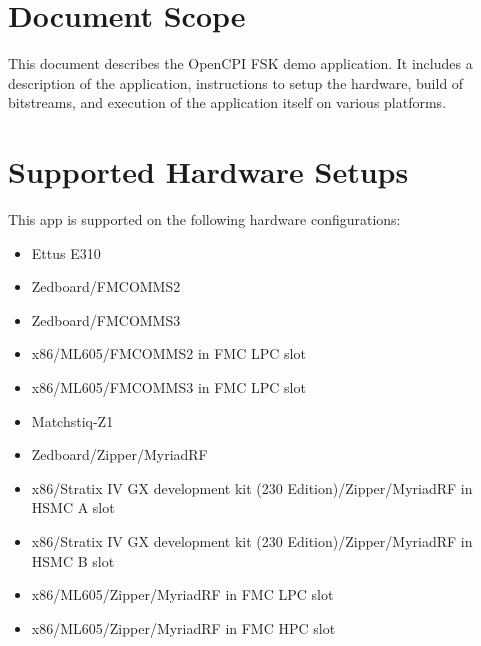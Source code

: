 \newpage
\tableofcontents
\pagebreak
\section{Document Scope}
This document describes the OpenCPI FSK demo application. It includes a description of the application, instructions to setup the hardware, build of bitstreams, and execution of the application itself on various platforms.

\section{Supported Hardware Setups}
This app is supported on the following hardware configurations:
\begin{itemize}
  \item Ettus E310
  \item Zedboard/FMCOMMS2
  \item Zedboard/FMCOMMS3
  \item x86/ML605/FMCOMMS2 in FMC LPC slot
  \item x86/ML605/FMCOMMS3 in FMC LPC slot
  \item Matchstiq-Z1
  \item Zedboard/Zipper/MyriadRF
  \item x86/Stratix IV GX development kit (230 Edition)/Zipper/MyriadRF in HSMC A slot
  \item x86/Stratix IV GX development kit (230 Edition)/Zipper/MyriadRF in HSMC B slot
  \item x86/ML605/Zipper/MyriadRF in FMC LPC slot
  \item x86/ML605/Zipper/MyriadRF in FMC HPC slot
\end{itemize}

